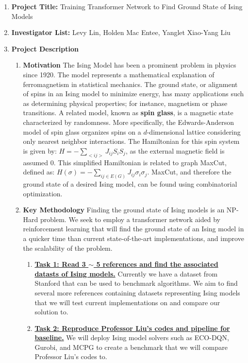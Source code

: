 \documentclass{article}
\begin{document}
\begin{enumerate}
\item \textbf{Project Title:} Training Transformer Network to Find Ground State of Ising Models

\item \textbf{Investigator List:} Levy Lin, Holden Mac Entee, Yanglet Xiao-Yang Liu

\item \textbf{Project Description}
\begin{enumerate}
	\item \textbf{Motivation}
	\newline
	The Ising Model has been a prominent problem in physics since 1920. The model represents a mathematical explanation of ferromagnetism in statistical mechanics. The ground state, or alignment of spins in an Ising model to minimize energy, has many applications such as determining physical properties; for instance, magnetism or phase transitions. A related model, known as \textbf{spin glass}, is a magnetic state characterized by randomness. More specifically, the Edwards-Anderson model of spin glass organizes spins on a $d$-dimensional lattice considering only nearest neighbor interactions. The Hamiltonian for this spin system is given by: $H = - \sum_{<ij>}J_{ij}S_iS_j$, as the external magnetic field is assumed 0. This simplified Hamiltonian is related to graph MaxCut, defined as: $H(\sigma) = - \sum_{ij\in E(G)}J_{ij}\sigma_i\sigma_j$. MaxCut, and therefore the ground state of a desired Ising model, can be found using combinatorial optimization.

	\item \textbf{Key Methodology}
	\newline
		Finding the ground state of Ising models is an NP-Hard problem. We seek to employ a transformer network aided by reinforcement learning that will find the ground state of an Ising model in a quicker time than current state-of-the-art implementations, and improve the scalability of the problem.
	\begin{enumerate}
			
		\item \textbf{\underline{Task 1: Read 3 $\sim$ 5 references and find the associated datasts of Ising models.}}
		\newline Currently we have a dataset from Stanford that can be used to benchmark algorithms. We aim to find several more references containing datasets representing Ising models that we will test current implementations on and compare our solution to.
		\item \textbf{\underline{Task 2: Reproduce Professor Liu's codes and pipeline for baseline.}}  We will deploy Ising model solvers such as ECO-DQN, Gurobi, and MCPG to create a benchmark that we will compare Professor Liu's codes to.


\end{enumerate}
\end{enumerate}
\end{enumerate}
\end{document}
